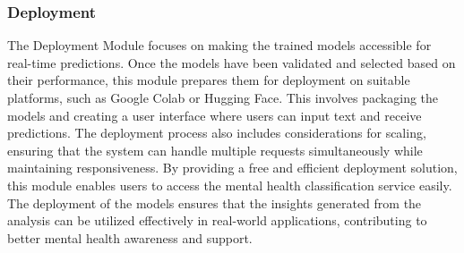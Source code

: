 \subsubsection{Deployment}
\noindent
The Deployment Module focuses on making the trained models accessible for real-time predictions. Once the models have been validated and selected based on their performance, this module prepares them for deployment on suitable platforms, such as Google Colab or Hugging Face. This involves packaging the models and creating a user interface where users can input text and receive predictions. The deployment process also includes considerations for scaling, ensuring that the system can handle multiple requests simultaneously while maintaining responsiveness. By providing a free and efficient deployment solution, this module enables users to access the mental health classification service easily. The deployment of the models ensures that the insights generated from the analysis can be utilized effectively in real-world applications, contributing to better mental health awareness and support.











